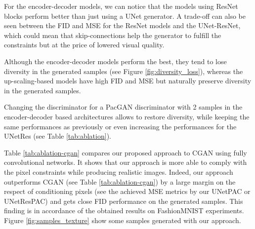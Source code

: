 For the encoder-decoder models, we can notice that the models using ResNet blocks perform better than just using a UNet generator. A trade-off can also be seen between the FID and MSE for the ResNet models and the UNet-ResNet, which could mean that skip-connections help the generator to fulfill the constraints but at the price of lowered visual quality.

Although the encoder-decoder models perform the best, they tend to lose diversity in the generated samples (see Figure \ref{fig:diversity_loss}), whereas the up-scaling-based models have high FID and MSE but naturally preserve diversity in the generated samples.

Changing the discriminator for a PacGAN discriminator with 2 samples in the encoder-decoder based architectures allows to restore diversity, while keeping the same performances as previously or even increasing the performances for the UNetRes (see Table \ref{tab:ablation}).

Table \ref{tab:ablation-cgan} compares our proposed approach to CGAN using fully convolutional networks. It shows that our approach is more able to comply with the pixel constraints while producing realistic images. Indeed, our approach outperforms CGAN (see Table \ref{tab:ablation-cgan}) by a large margin on the respect of conditioning pixels (see the achieved MSE metrics by  our UNetPAC or UNetResPAC)  and gets  close FID performance on the generated samples. This finding is in accordance of the obtained results on FashionMNIST experiments. Figure \ref{fig:samples_texture} show some samples generated with our approach.

